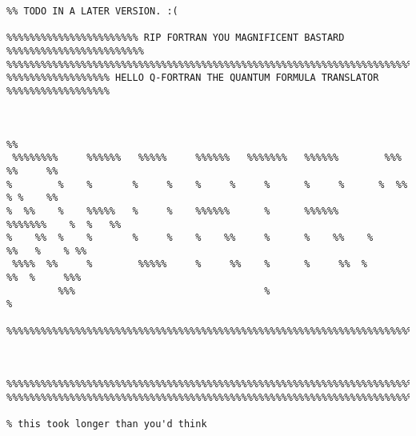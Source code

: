 \documentclass[12pt]{book}
\begin{document}
\setlength{\parskip}{0.5em}















%  




\newpage 
\begin{verbatim}
%% TODO IN A LATER VERSION. :(

%%%%%%%%%%%%%%%%%%%%%%% RIP FORTRAN YOU MAGNIFICENT BASTARD %%%%%%%%%%%%%%%%%%%%%%%%
%%%%%%%%%%%%%%%%%%%%%%%%%%%%%%%%%%%%%%%%%%%%%%%%%%%%%%%%%%%%%%%%%%%%%%%%%%%%%%%%%%%%
%%%%%%%%%%%%%%%%%% HELLO Q-FORTRAN THE QUANTUM FORMULA TRANSLATOR %%%%%%%%%%%%%%%%%%


                                                                                  %%
 %%%%%%%%     %%%%%%   %%%%%     %%%%%%   %%%%%%%   %%%%%%        %%%      %%     %%
%        %    %       %     %    %     %     %      %     %      %  %%     % %    %%
%  %%    %    %%%%%   %     %    %%%%%%      %      %%%%%%      %%%%%%%    %  %   %%
%    %%  %    %       %     %    %    %%     %      %    %%    %      %%   %    % %%
 %%%%  %%     %        %%%%%     %     %%    %      %     %%  %        %%  %     %%%
         %%%                                 %                             %
            %%%%%%%%%%%%%%%%%%%%%%%%%%%%%%%%%%%%%%%%%%%%%%%%%%%%%%%%%%%%%%%%%%%%%%%%
                                             
                                             
                                             
%%%%%%%%%%%%%%%%%%%%%%%%%%%%%%%%%%%%%%%%%%%%%%%%%%%%%%%%%%%%%%%%%%%%%%%%%%%%%%%%%%%%                
%%%%%%%%%%%%%%%%%%%%%%%%%%%%%%%%%%%%%%%%%%%%%%%%%%%%%%%%%%%%%%%%%%%%%%%%%%%%%%%%%%%%

% this took longer than you'd think
\end{verbatim}
%
\appendix

\end{document}
